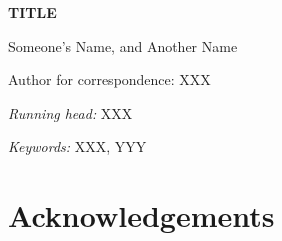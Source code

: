\documentclass[11pt]{article}
\begin{document}

\begin{center}
    \textbf{TITLE}
\end{center}

\vfill

\noindent
Someone's Name,%
%
and
Another Name%

\vfill

\theendnotes

\noindent
Author for correspondence: XXX

\vfill

\noindent
\textit{Running head:} XXX

\vfill

\noindent
\textit{Keywords:} 
XXX,
YYY

\vfill

\linenumbers


\clearpage



\clearpage





\section{Acknowledgements}


\clearpage



\setstretch{\stretchby}
\end{document}
